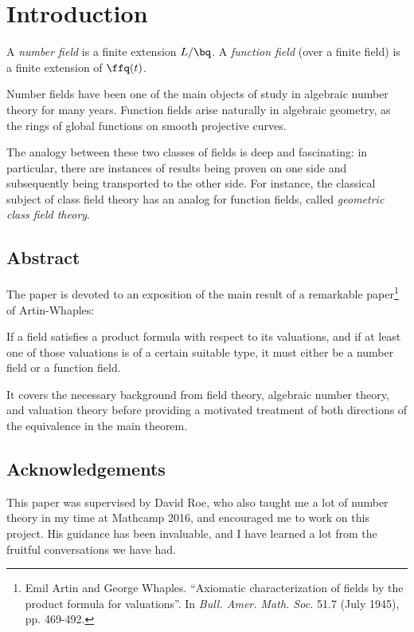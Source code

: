 \chapter*{Introduction}

A \textit{number field} is a finite extension $L/\bq$. A \textit{function field}
(over a finite field) is a finite extension of $\ffq(t)$.

Number fields have been one of the main objects of study in algebraic number
theory for many years. Function fields arise naturally in algebraic geometry, as
the rings of global functions on smooth projective curves.

The analogy between these two classes of fields is deep and fascinating: in
particular, there are instances of results being proven on one side and
subsequently being transported to the other side. For instance, the classical
subject of class field theory has an analog for function fields, called
\textit{geometric class field theory}.

\section*{Abstract}
The paper is devoted to an exposition of the main result of a remarkable
paper\footnote{Emil Artin and George Whaples. ``Axiomatic characterization of
  fields by the product formula for valuations''. In \textit{Bull. Amer. Math.
    Soc.} 51.7 (July 1945), pp. 469-492.} of Artin-Whaples:

\begin{thm}
  If a field satisfies a product formula with respect to its valuations, and if
  at least one of those valuations is of a certain suitable type, it must either
  be a number field or a function field.
\end{thm}

It covers the necessary background from field theory, algebraic number theory,
and valuation theory before providing a motivated treatment of both
directions of the equivalence in the main theorem.

\section*{Acknowledgements}
This paper was supervised by David Roe, who also taught me a lot of number
theory in my time at Mathcamp 2016, and encouraged me to work on this project.
His guidance has been invaluable, and I have learned a lot from the fruitful
conversations we have had.

